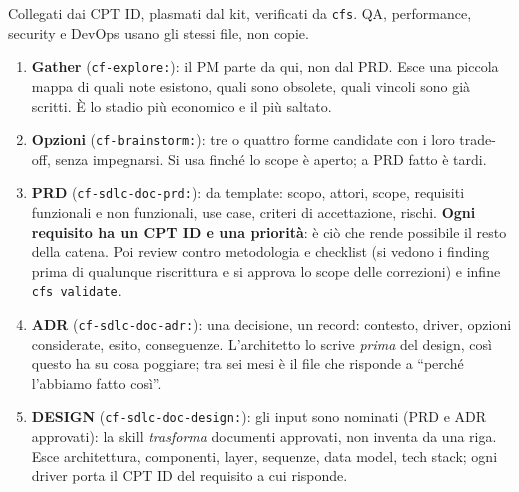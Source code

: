 \documentclass[a4paper,12pt]{article}
\begin{document}
\begin{center}
\end{center}
Collegati dai CPT ID, plasmati dal kit, verificati da \texttt{cfs}. QA, performance,
security e DevOps usano gli stessi file, non copie.

\begin{enumerate}
  \item \textbf{Gather} (\texttt{cf-explore:}): il PM parte da qui, non dal PRD. Esce una
        piccola mappa di quali note esistono, quali sono obsolete, quali vincoli sono già
        scritti. È lo stadio più economico e il più saltato.
  \item \textbf{Opzioni} (\texttt{cf-brainstorm:}): tre o quattro forme candidate con i
        loro trade-off, senza impegnarsi. Si usa finché lo scope è aperto; a PRD fatto
        è tardi.
  \item \textbf{PRD} (\texttt{cf-sdlc-doc-prd:}): da template: scopo, attori, scope,
        requisiti funzionali e non funzionali, use case, criteri di accettazione,
        rischi. \textbf{Ogni requisito ha un CPT ID e una priorità}: è ciò che rende
        possibile il resto della catena. Poi review contro metodologia e checklist (si
        vedono i finding prima di qualunque riscrittura e si approva lo scope delle
        correzioni) e infine \texttt{cfs validate}.
  \item \textbf{ADR} (\texttt{cf-sdlc-doc-adr:}): una decisione, un record: contesto,
        driver, opzioni considerate, esito, conseguenze. L'architetto lo scrive
        \emph{prima} del design, così questo ha su cosa poggiare; tra sei mesi è il file
        che risponde a ``perché l'abbiamo fatto così''.
  \item \textbf{DESIGN} (\texttt{cf-sdlc-doc-design:}): gli input sono nominati (PRD e
        ADR approvati): la skill \emph{trasforma} documenti approvati, non inventa da
        una riga. Esce architettura, componenti, layer, sequenze, data model, tech
        stack; ogni driver porta il CPT ID del requisito a cui risponde.

\end{enumerate}
\end{document}
